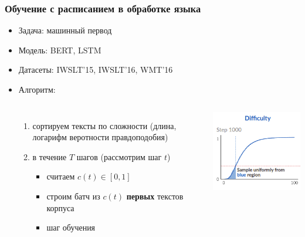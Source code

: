 \documentclass{beamer}
\begin{document}
\begin{frame}
	\frametitle{Обучение с расписанием в обработке языка}		\let\thefootnote\relax{}
	\begin{itemize}
		\item Задача: машинный первод
		\item Модель: BERT, LSTM
		\item Датасеты: IWSLT'15, IWSLT'16, WMT'16
		\item Алгоритм:
			\begin{columns}
					\begin{enumerate}
						\item сортируем тексты по сложности (длина, логарифм веротности правдоподобия)
						\item в течение $T$ шагов (рассмотрим шаг $t$)
						\begin{itemize}
							\item считаем $c(t) \in [0, 1]$
							\item строим батч из $c(t)$ {\bf первых} текстов корпуса
							\item шаг обучения
						\end{itemize}
					\end{enumerate}
				\includegraphics[scale=0.6]{acl19_algo.png}
			\end{columns}
	\end{itemize}
\end{frame}
\end{document}
